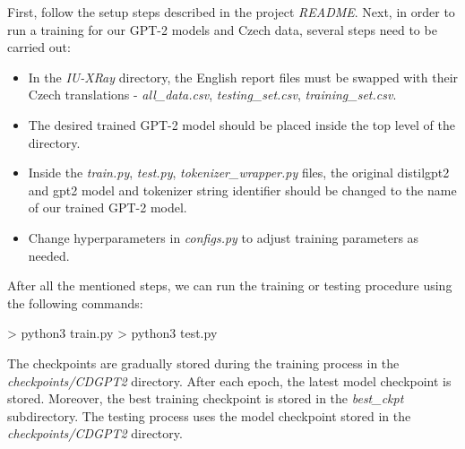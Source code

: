 First, follow the setup steps described in the project \textit{README}. Next, in order to run a training for our GPT-2 models and Czech data, several steps need to be carried out:
\begin{itemize}
	\item In the \textit{IU-XRay} directory, the English report files must be swapped with their Czech translations - \textit{all\_data.csv}, \textit{testing\_set.csv}, \textit{training\_set.csv}.
	\item The desired trained GPT-2 model should be placed inside the top level of the directory.
	\item Inside the \textit{train.py}, \textit{test.py}, \textit{tokenizer\_wrapper.py} files, the original distilgpt2 and gpt2 model and tokenizer string identifier should be changed to the name of our trained GPT-2 model.
	\item Change hyperparameters in \textit{configs.py} to adjust training parameters as needed.
\end{itemize}
\newpage

After all the mentioned steps, we can run the training or testing procedure using the following commands:
\begin{code}
> python3 train.py
> python3 test.py
\end{code}

The checkpoints are gradually stored during the training process in the \textit{checkpoints/CDGPT2} directory. After each epoch, the latest model checkpoint is stored. Moreover, the best training checkpoint is stored in the \textit{best\_ckpt} subdirectory. The testing process uses the model checkpoint stored in the \textit{checkpoints/CDGPT2} directory.